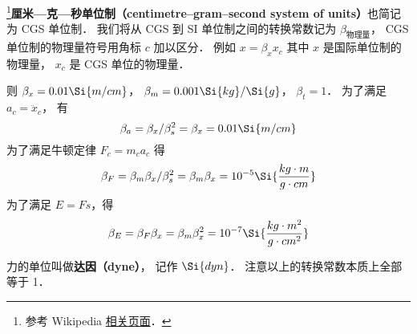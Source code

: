 
\begin{issues}
\issueDraft
{}
\end{issues}


\footnote{参考 Wikipedia \href{https://en.wikipedia.org/wiki/Centimetre-gram-second_system_of_units}{相关页面}．}\textbf{厘米—克—秒单位制（centimetre–gram–second system of units）}也简记为 CGS 单位制． 我们将从 CGS 到 SI 单位制之间的转换常数记为 $\beta_\text{物理量}$， CGS 单位制的物理量符号用角标 $c$ 加以区分． 例如 $x = \beta_x x_c$ 其中 $x$ 是国际单位制的物理量， $x_c$ 是 CGS 单位的物理量．

则 $\beta_x = 0.01\Si{m/cm}$， $\beta_m = 0.001\Si{kg}/\Si{g}$， $\beta_t = 1$． 为了满足 $a_c = \ddot x_c$， 有
\begin{equation}
\beta_a = \beta_x/\beta_s^2 = \beta_x = 0.01 \Si{m/cm}
\end{equation}
为了满足牛顿定律 $F_c = m_ca_c$ 得
\begin{equation}
\beta_F = \beta_m \beta_x/\beta_s^2 = \beta_m\beta_x = 10^{-5} \Si{\frac{kg\cdot m}{g\cdot cm}}
\end{equation}
为了满足 $E = Fs$，得
\begin{equation}
\beta_E = \beta_F \beta_x = \beta_m\beta_x^2 =  10^{-7} \Si{\frac{kg \cdot m^2}{g\cdot cm^2}}
\end{equation}

力的单位叫做\textbf{达因（dyne）}， 记作 $\Si{dyn}$． 注意以上的转换常数本质上全部等于 1．
